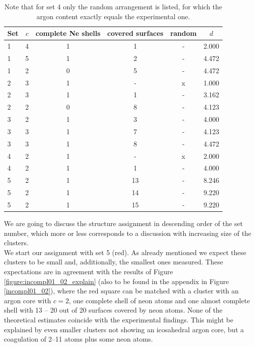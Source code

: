 \begin{table}[!h]
  \caption{Note that for set 4 only the random arrangement is listed,
           for which the argon content exactly equals the experimental one.}
  \centering
  \begin{tabular}{lccccc}
    \toprule
     Set  & $c$ & complete Ne shells & covered surfaces & random & $d$\\
    \midrule
      1   & 4   &          1         &        1         &   -    & 2.000\\
      1   & 5   &          1         &        2         &   -    & 4.472\\
      1   & 2   &          0         &        5         &   -    & 4.472\\
    \midrule
      2   & 3   &          1         &        -         &   x    & 1.000\\
      2   & 3   &          1         &        1         &   -    & 3.162\\
      2   & 2   &          0         &        8         &   -    & 4.123\\
    \midrule
      3   & 2   &          1         &        3         &   -    & 4.000\\
      3   & 3   &          1         &        7         &   -    & 4.123\\
      3   & 3   &          1         &        8         &   -    & 4.472\\
    \midrule
      4   & 2   &          1         &        -         &   x    & 2.000\\
      4   & 2   &          1         &        1         &   -    & 4.000\\
    \midrule
      5   & 2   &          1         &       13         &   -    & 8.246\\
      5   & 2   &          1         &       14         &   -    & 9.220\\
      5   & 2   &          1         &       15         &   -    & 9.220\\
    \bottomrule
  \end{tabular}
  \label{table:assignments}
\end{table}

We are going to discuss the structure assignment in descending order
of the set number, which more or less corresponds to a discussion with
increasing size of the clusters.\\
We start our assignment with set 5 (red). As already mentioned we expect these clusters
to be small and, additionally, the smallest ones measured. These expectations are
in agreement with the results of Figure \ref{figure:incompl01_02_explain}
(also to be found in the
appendix in Figure \ref{incompl01_02}), where the red square
can be matched with a cluster with an argon core with $c=2$, one complete
shell of neon atoms 
and one almost complete
shell with 13 -- 20 out of 20 surfaces covered by neon atoms. None of the
theoretical estimates coincide with the experimental findings. This might be
explained by even smaller clusters not showing an icosahedral argon core, but
a coagulation of 2--11 atoms plus some neon atoms.

